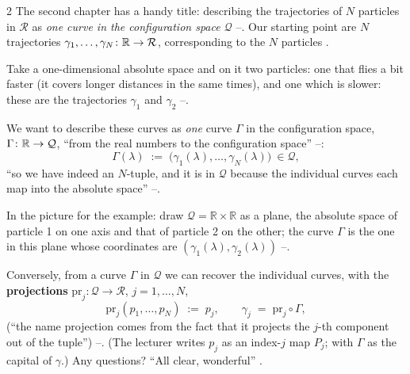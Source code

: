 \begin{paracol}{2}
The second chapter has a handy title: describing the trajectories of $N$ particles in $\mathcal R$ as \emph{one curve in the configuration space $\mathcal Q$} --. Our starting point are $N$ trajectories $\gamma_1,\dots,\gamma_N\colon\mathbb{R}\to\mathcal R$, corresponding to the $N$ particles .

\begin{example}\label{ex:mp-line}
Take a one-dimensional absolute space and on it two particles: one that flies a bit faster (it covers longer distances in the same times), and one which is slower: these are the trajectories $\gamma_1$ and $\gamma_2$ --.
\end{example}

We want to describe these curves as \emph{one} curve $\Gamma$ in the configuration space, $\Gamma\colon\mathbb{R}\to\mathcal Q$, ``from the real numbers to the configuration space'' --:
\begin{equation}\label{eq:mp-Gamma}
  \Gamma(\lambda)\;:=\;\bigl(\gamma_1(\lambda),\dots,\gamma_N(\lambda)\bigr)\ \in\mathcal Q ,
\end{equation}
``so we have indeed an $N$-tuple, and it is in $\mathcal Q$ because the individual curves each map into the absolute space'' --.

In the picture for the example: draw $\mathcal Q=\mathbb R\times\mathbb R$ as a plane, the absolute space of particle 1 on one axis and that of particle 2 on the other; the curve $\Gamma$ is the one in this plane whose coordinates are $(\gamma_1(\lambda),\gamma_2(\lambda))$ --.

Conversely, from a curve $\Gamma$ in $\mathcal Q$ we can recover the individual curves, with the \textbf{projections} $\mathrm{pr}_j\colon\mathcal Q\to\mathcal R$, $j=1,\dots,N$,
\begin{equation}\label{eq:mp-proj}
  \mathrm{pr}_j(p_1,\dots,p_N)\;:=\;p_j,\qquad\gamma_j\;=\;\mathrm{pr}_j\circ\Gamma ,
\end{equation}
(``the name projection comes from the fact that it projects the $j$-th component out of the tuple'') --. (The lecturer writes $p_j$ as an index-$j$ map $P_j$; with $\Gamma$ as the capital of $\gamma$.) Any questions? ``All clear, wonderful'' .


\end{paracol}
